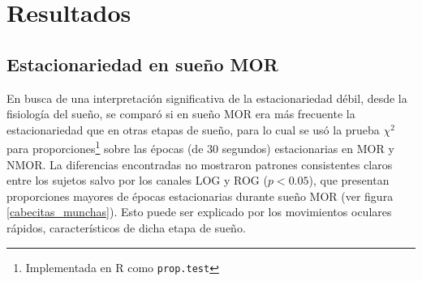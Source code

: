 

\chapter{Resultados}


\section{Estacionariedad en sueño MOR}

En busca de una interpretación significativa de la estacionariedad débil, desde la fisiología del
sueño, se comparó si en sueño MOR era más frecuente la estacionariedad que en otras etapas de 
sueño, para lo cual se usó la prueba $\chi^{2}$ para proporciones\footnote{Implementada en R como 
\texttt{prop.test}} sobre las épocas (de 30 segundos) estacionarias en MOR y NMOR.
%
La diferencias encontradas no mostraron patrones consistentes claros entre los sujetos salvo por 
los canales LOG y ROG ($p<0.05$), que presentan proporciones mayores de épocas estacionarias 
durante sueño MOR (ver figura \ref{cabecitas_munchas}). Esto puede ser explicado por los 
movimientos oculares rápidos, característicos de dicha etapa de sueño.
%

